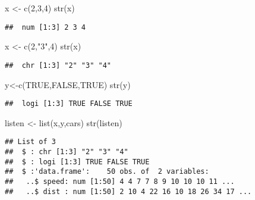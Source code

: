 \documentclass[
]{article}
\newenvironment{Shaded}{\begin{snugshade}}{\end{snugshade}}
\newcommand{\ConstantTok}[1]{\textcolor[rgb]{0.00,0.00,0.00}{#1}}
\newcommand{\DecValTok}[1]{\textcolor[rgb]{0.00,0.00,0.81}{#1}}
\newcommand{\FunctionTok}[1]{\textcolor[rgb]{0.00,0.00,0.00}{#1}}
\newcommand{\NormalTok}[1]{#1}
\newcommand{\OtherTok}[1]{\textcolor[rgb]{0.56,0.35,0.01}{#1}}
\newcommand{\StringTok}[1]{\textcolor[rgb]{0.31,0.60,0.02}{#1}}
\begin{document}
\begin{Shaded}
\begin{Highlighting}[]
\NormalTok{x }\OtherTok{\textless{}{-}} \FunctionTok{c}\NormalTok{(}\DecValTok{2}\NormalTok{,}\DecValTok{3}\NormalTok{,}\DecValTok{4}\NormalTok{)}
\FunctionTok{str}\NormalTok{(x)}
\end{Highlighting}
\end{Shaded}

\begin{verbatim}
##  num [1:3] 2 3 4
\end{verbatim}

\begin{Shaded}
\begin{Highlighting}[]
\NormalTok{x }\OtherTok{\textless{}{-}} \FunctionTok{c}\NormalTok{(}\DecValTok{2}\NormalTok{,}\StringTok{"3"}\NormalTok{,}\DecValTok{4}\NormalTok{)}
\FunctionTok{str}\NormalTok{(x)}
\end{Highlighting}
\end{Shaded}

\begin{verbatim}
##  chr [1:3] "2" "3" "4"
\end{verbatim}

\begin{Shaded}
\begin{Highlighting}[]
\NormalTok{y}\OtherTok{\textless{}{-}}\FunctionTok{c}\NormalTok{(}\ConstantTok{TRUE}\NormalTok{,}\ConstantTok{FALSE}\NormalTok{,}\ConstantTok{TRUE}\NormalTok{)}
\FunctionTok{str}\NormalTok{(y)}
\end{Highlighting}
\end{Shaded}

\begin{verbatim}
##  logi [1:3] TRUE FALSE TRUE
\end{verbatim}

\begin{Shaded}
\begin{Highlighting}[]
\NormalTok{listen }\OtherTok{\textless{}{-}} \FunctionTok{list}\NormalTok{(x,y,cars)}
\FunctionTok{str}\NormalTok{(listen)}
\end{Highlighting}
\end{Shaded}

\begin{verbatim}
## List of 3
##  $ : chr [1:3] "2" "3" "4"
##  $ : logi [1:3] TRUE FALSE TRUE
##  $ :'data.frame':    50 obs. of  2 variables:
##   ..$ speed: num [1:50] 4 4 7 7 8 9 10 10 10 11 ...
##   ..$ dist : num [1:50] 2 10 4 22 16 10 18 26 34 17 ...
\end{verbatim}
\end{document}
